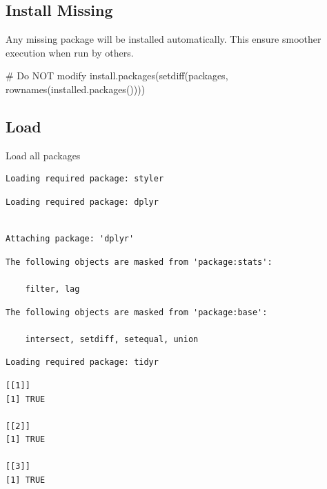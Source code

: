 \documentclass[
  letterpaper,
  DIV=11,
  numbers=noendperiod]{scrreprt}
\newenvironment{Shaded}{\begin{snugshade}}{\end{snugshade}}
\newcommand{\CommentTok}[1]{\textcolor[rgb]{0.37,0.37,0.37}{#1}}
\newcommand{\FunctionTok}[1]{\textcolor[rgb]{0.28,0.35,0.67}{#1}}
\newcommand{\NormalTok}[1]{\textcolor[rgb]{0.00,0.23,0.31}{#1}}
\begin{document}
\subsection{Install Missing}\label{install-missing-5}

Any missing package will be installed automatically. This ensure
smoother execution when run by others.

\begin{Shaded}
\begin{Highlighting}[]
\CommentTok{\# Do NOT modify}
\FunctionTok{install.packages}\NormalTok{(}\FunctionTok{setdiff}\NormalTok{(packages, }\FunctionTok{rownames}\NormalTok{(}\FunctionTok{installed.packages}\NormalTok{())))}
\end{Highlighting}
\end{Shaded}

\subsection{Load}\label{load-5}

Load all packages

\begin{verbatim}
Loading required package: styler
\end{verbatim}

\begin{verbatim}
Loading required package: dplyr
\end{verbatim}

\begin{verbatim}

Attaching package: 'dplyr'
\end{verbatim}

\begin{verbatim}
The following objects are masked from 'package:stats':

    filter, lag
\end{verbatim}

\begin{verbatim}
The following objects are masked from 'package:base':

    intersect, setdiff, setequal, union
\end{verbatim}

\begin{verbatim}
Loading required package: tidyr
\end{verbatim}

\begin{verbatim}
[[1]]
[1] TRUE

[[2]]
[1] TRUE

[[3]]
[1] TRUE
\end{verbatim}
\end{document}
